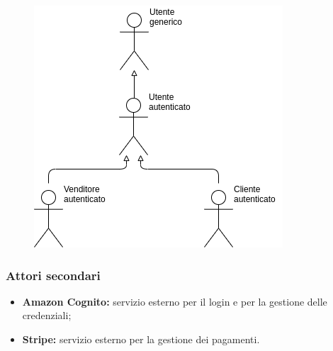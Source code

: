 \begin{itemize}
\begin{itemize}
\begin{figure}[!ht]
                            \includegraphics[scale=0.6]{../../../Images/AnalisiRequisiti/attori}
                            \centering
                        \end{figure}
                \end{itemize}
        \end{itemize}
        \subsubsection{Attori secondari}
        \begin{itemize}
            \item \textbf{Amazon Cognito:} servizio esterno per il login e per la gestione delle credenziali;
            \item \textbf{Stripe:} servizio esterno per la gestione dei pagamenti.
        \end{itemize}
        \newpage

